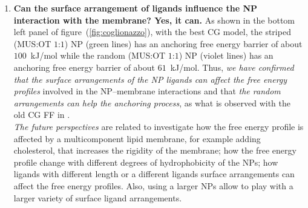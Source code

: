 \begin{enumerate}[label=\itshape\roman*.,listparindent=1em]
	\item \textbf{\textsf{Can the surface arrangement of ligands influence the \ac{NP} interaction with the membrane? Yes, it can.}} As shown in the bottom left panel of figure~(\ref{fig:coglionazzo}), with the best \ac{CG} model, the striped (\acs{MUS}:\acs{OT} $1$:$1$) \ac{NP} (green lines) has an anchoring free energy barrier of about $100$~kJ/mol while the random (\acs{MUS}:\acs{OT} $1$:$1$) \ac{NP} (violet lines) has an anchoring free energy barrier of about $61$~kJ/mol. Thus, \textit{we have confirmed that the surface arrangements of the \ac{NP} ligands can affect the free energy profiles} involved in the \ac{NP}--membrane interactions and that \textit{the random arrangements can help the anchoring process}, as what is observed with the old \ac{CG} \ac{FF} in \cite{ourPaper}.
	\\\indent\textit{The future perspectives} are related to investigate how the free energy profile is affected by a multicomponent lipid membrane, for example adding cholesterol, that increases the rigidity of the membrane; how the free energy profile change with different degrees of hydrophobicity of the \acp{NP}; how ligands with different length or a different ligands surface arrangements can affect the free energy profiles. Also, using a larger \acp{NP} allow to play with a larger variety of surface ligand arrangements.
\end{enumerate}

\restoretoc
\endgroup